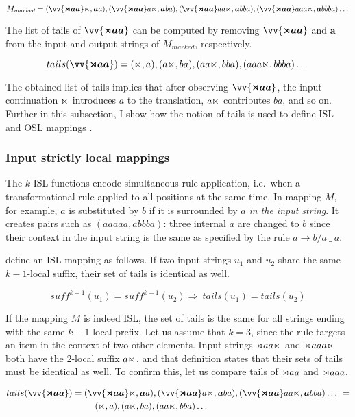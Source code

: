 $$
M_{marked} = (\vv{\bm{\bow aa}}\eow, \bm{a}a), (\vv{\bm{\bow aa}}a\eow, \bm{a}ba), (\vv{\bm{\bow aa}}aa\eow, \bm{a}bba), (\vv{\bm{\bow aa}}aaa\eow, \bm{a}bbba) \dots
$$

The list of tails of $\vv{\bm{\bow aa}}$ can be computed by removing $\vv{\bm{\bow aa}}$ and $\bm{a}$ from the input and output strings of $M_{marked}$, respectively.

$$
tails(\vv{\bm{\bow aa}}) = (\eow, a), (a\eow, ba), (aa\eow, bba), (aaa\eow, bbba)\dots
$$

The obtained list of tails implies that after observing $\vv{\bm{\bow aa}}$, the input continuation $\ltimes$ introduces $a$ to the translation,  $a\ltimes$ contributes $ba$, and so on.
Further in this subsection, I show how the notion of tails is used to define ISL and OSL mappings \citep{Chandlee2014,ChandleeEtAl2014,ChandleeEtAl2015}.



\subsubsection{Input strictly local mappings}

The $k$-ISL functions encode simultaneous rule application, i.e.\ when a transformational rule applied to all positions at the same time.
In mapping $M$, for example, $a$ is substituted by $b$ if it is surrounded by $a$ \emph{in the input string}.
It creates pairs such as $(aaaaa, abbba)$: three internal $a$ 
are changed to $b$ since their context in the input string is the same as specified by the rule $a \rightarrow b / a~ \_~ a$.

\cite{ChandleeEtAl2014} define an ISL mapping as follows.
If two input strings $u_1$ and $u_2$ share the same $k-1$-local suffix, their set of tails is identical as well.

\[
	suff^{k-1}(u_1) = suff^{k-1}(u_2) \Rightarrow~ tails(u_1) = tails(u_2)
\]

If the mapping $M$ is indeed ISL, the set of tails is the same for all strings ending with the same $k-1$ local prefix.
Let us assume that $k=3$, since the rule targets an item in the context of two other elements.
Input strings $\rtimes aa\ltimes$ and $\rtimes aaa\ltimes$ both have the $2$-local suffix $a\ltimes$, and that definition states that their sets of tails must be identical as well.
To confirm this, let us compare tails of $\rtimes aa$ and $\rtimes aaa$.


\begin{multline*}
tails(\vv{\bm{\bow aa}}) = (\vv{\bm{\bow aa}}\eow, \bm{a}a), (\vv{\bm{\bow aa}}a\eow, \bm{a}ba), (\vv{\bm{\bow aa}}aa\eow, \bm{a}bba) \dots~ =  \\
 \qquad\qquad\qquad\qquad\quad \shoveleft{(\eow, a), (a\eow, ba), (aa\eow, bba) \dots}
\end{multline*}


